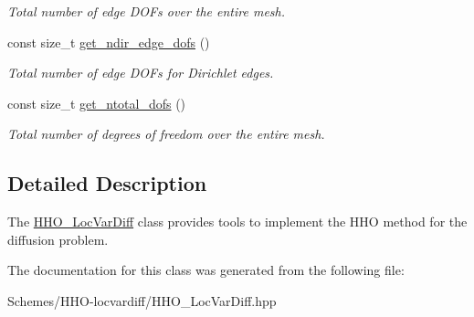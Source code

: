 \begin{DoxyCompactItemize}
\begin{DoxyCompactList}\small\item\em Total number of edge D\+O\+Fs over the entire mesh. \end{DoxyCompactList}\item 
\mbox{\label{classHArDCore2D_1_1HHO__LocVarDiff_aecb29f27e40c73300e20075e8f9f5d3b}} 
const size\+\_\+t \hyperlink{classHArDCore2D_1_1HHO__LocVarDiff_aecb29f27e40c73300e20075e8f9f5d3b}{get\+\_\+ndir\+\_\+edge\+\_\+dofs} ()
\begin{DoxyCompactList}\small\item\em Total number of edge D\+O\+Fs for Dirichlet edges. \end{DoxyCompactList}\item 
\mbox{\label{classHArDCore2D_1_1HHO__LocVarDiff_a3c58f6557feeea1edc9db4290a95bf4e}} 
const size\+\_\+t \hyperlink{classHArDCore2D_1_1HHO__LocVarDiff_a3c58f6557feeea1edc9db4290a95bf4e}{get\+\_\+ntotal\+\_\+dofs} ()
\begin{DoxyCompactList}\small\item\em Total number of degrees of freedom over the entire mesh. \end{DoxyCompactList}\end{DoxyCompactItemize}


\subsection{Detailed Description}
The \hyperlink{classHArDCore2D_1_1HHO__LocVarDiff}{H\+H\+O\+\_\+\+Loc\+Var\+Diff} class provides tools to implement the H\+HO method for the diffusion problem. 

The documentation for this class was generated from the following file\+:\begin{DoxyCompactItemize}
\item 
Schemes/\+H\+H\+O-\/locvardiff/H\+H\+O\+\_\+\+Loc\+Var\+Diff.\+hpp\end{DoxyCompactItemize}
